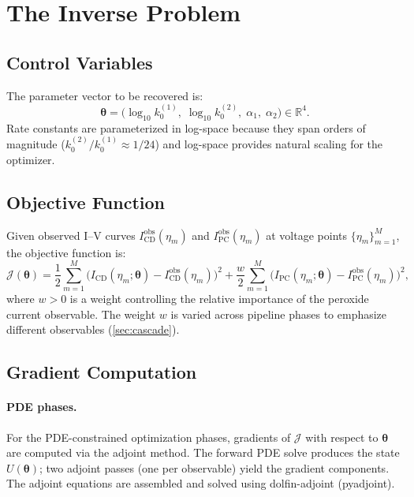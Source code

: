 \documentclass[11pt,a4paper]{article}
\newcommand{\R}{\mathbb{R}}
\newcommand{\vect}[1]{\boldsymbol{#1}}
\newcommand{\kzero}{k_0}
\newcommand{\Jobj}{\mathcal{J}}
\begin{document}
\section{The Inverse Problem}\label{sec:inverse}

\subsection{Control Variables}\label{sec:controls}

The parameter vector to be recovered is:
\begin{equation}\label{eq:theta}
  \vect{\theta} = \bigl(\log_{10} \kzero^{(1)},\;
    \log_{10} \kzero^{(2)},\; \alpha_1,\; \alpha_2 \bigr) \in \R^4.
\end{equation}
Rate constants are parameterized in log-space because they span orders of
magnitude ($\kzero^{(2)} / \kzero^{(1)} \approx 1/24$) and log-space
provides natural scaling for the optimizer.

\subsection{Objective Function}\label{sec:objective}

Given observed I--V curves $I_{\mathrm{CD}}^{\mathrm{obs}}(\eta_m)$ and
$I_{\mathrm{PC}}^{\mathrm{obs}}(\eta_m)$ at voltage points
$\{\eta_m\}_{m=1}^M$, the objective function is:
\begin{equation}\label{eq:objective}
  \Jobj(\vect{\theta}) = \frac{1}{2}\sum_{m=1}^M
    \bigl(I_{\mathrm{CD}}(\eta_m; \vect{\theta}) - I_{\mathrm{CD}}^{\mathrm{obs}}(\eta_m)\bigr)^2
  + \frac{w}{2}\sum_{m=1}^M
    \bigl(I_{\mathrm{PC}}(\eta_m; \vect{\theta}) - I_{\mathrm{PC}}^{\mathrm{obs}}(\eta_m)\bigr)^2,
\end{equation}
where $w > 0$ is a weight controlling the relative importance of
the peroxide current observable. The weight $w$ is varied across pipeline
phases to emphasize different observables (\cref{sec:cascade}).

\subsection{Gradient Computation}\label{sec:gradients}

\paragraph{PDE phases.}
For the PDE-constrained optimization phases, gradients of $\Jobj$ with
respect to $\vect{\theta}$ are computed via the adjoint method. The
forward PDE solve produces the state $U(\vect{\theta})$; two adjoint
passes (one per observable) yield the gradient components. The adjoint
equations are assembled and solved using dolfin-adjoint (pyadjoint).
\end{document}
